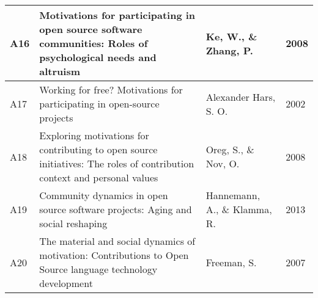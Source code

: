 \begin{landscape}
\begin{center}
\begin{longtable}{ | m{5em} | m{25em}| m{22em} | m{4em} | }
      A16        & Motivations for participating in open source software communities: Roles of psychological needs and altruism                                  & Ke, W., \& Zhang, P.                                                                                            & 2008  \\ \hline
      A17        & Working for free? Motivations for participating in open-source projects                                                                       & Alexander Hars, S. O.                                                                                           & 2002  \\ \hline
      A18        & Exploring motivations for contributing to open source initiatives: The roles of contribution context and personal values                      & Oreg, S., \& Nov, O.                                                                                            & 2008  \\ \hline
      A19        & Community dynamics in open source software projects: Aging and social reshaping                                                               & Hannemann, A., \& Klamma, R.                                                                                    & 2013  \\ \hline
      A20        & The material and social dynamics of motivation: Contributions to Open Source language technology development                                  & Freeman, S.                                                                                                     & 2007  \\ \hline
    \end{longtable}
  \end{center}
\end{landscape}

\clearpage %